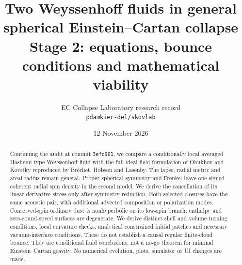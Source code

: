 \documentclass[11pt,a4paper]{article}
\title{Two Weyssenhoff fluids in general spherical Einstein--Cartan collapse\\\large Stage 2: equations, bounce conditions and mathematical viability}
\author{EC Collapse Laboratory research record\\\small\texttt{pdamkier-del/skovlab}}
\date{12 November 2026}
\begin{document}
\maketitle
\begin{abstract}
Continuing the audit at commit \texttt{3efc961}, we compare a conditionally local averaged Hashemi-type Weyssenhoff fluid with the full ideal field formulation of Obukhov and Korotky reproduced by Br\'echet, Hobson and Lasenby. The lapse, radial metric and areal radius remain general. Proper spherical symmetry and Frenkel leave one signed coherent radial spin density in the second model. We derive the cancellation of its linear derivative stress only after symmetry reduction. Both selected closures have the same acoustic pair, with additional advected composition or polarization modes. Conserved-spin ordinary dust is nonhyperbolic on its low-spin branch; enthalpy and zero-sound-speed surfaces are degenerate. We derive distinct shell and volume turning conditions, local curvature checks, analytical constrained initial patches and necessary vacuum-interface conditions. These do not establish a causal regular finite-cloud bounce. They are conditional fluid conclusions, not a no-go theorem for minimal Einstein--Cartan gravity. No numerical evolution, plots, simulator or UI changes are made.
\end{abstract}
\tableofcontents








\end{document}
